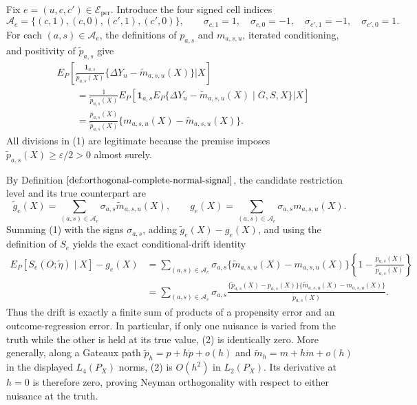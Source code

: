 Fix \(e=(u,c,c')\in\mathcal E_{\mathrm{per}}\).  Introduce the four signed cell indices
\[
\mathcal A_e=\{(c,1),(c,0),(c',1),(c',0)\},\qquad
\sigma_{c,1}=1,\quad \sigma_{c,0}=-1,\quad
\sigma_{c',1}=-1,\quad \sigma_{c',0}=1.
\]
For each \((a,s)\in\mathcal A_e\), the definitions of \(p_{a,s}\) and \(m_{a,s,u}\), iterated conditioning, and positivity of \(\widetilde p_{a,s}\) give
\[
\begin{aligned}
&E_P\!\left[
 \frac{\mathbf 1_{a,s}}{\widetilde p_{a,s}(X)}
 \{\Delta Y_u-\widetilde m_{a,s,u}(X)\}
 \mathrel{\Big|}X\right]\\
&\qquad=
\frac{1}{\widetilde p_{a,s}(X)}
 E_P\!\left[
 \mathbf 1_{a,s}
 E_P\{\Delta Y_u-\widetilde m_{a,s,u}(X)\mid G,S,X\}
 \mathrel{\Big|}X\right]\\
&\qquad=
\frac{p_{a,s}(X)}{\widetilde p_{a,s}(X)}
\{m_{a,s,u}(X)-\widetilde m_{a,s,u}(X)\}.
\end{aligned}
\tag{1}
\]
All divisions in (1) are legitimate because the premise imposes
\(\widetilde p_{a,s}(X)\geq\varepsilon/2>0\) almost surely.

By Definition \(\ref{def:orthogonal-complete-normal-signal}\), the candidate restriction level and its true counterpart are
\[
\widetilde g_e(X)=\sum_{(a,s)\in\mathcal A_e}
 \sigma_{a,s}\widetilde m_{a,s,u}(X),
\qquad
g_e(X)=\sum_{(a,s)\in\mathcal A_e}
 \sigma_{a,s}m_{a,s,u}(X).
\]
Summing (1) with the signs \(\sigma_{a,s}\), adding
\(\widetilde g_e(X)-g_e(X)\), and using the definition of \(S_e\) yields the exact conditional-drift identity
\[
\begin{aligned}
E_P[S_e(O;\widetilde\eta)\mid X]-g_e(X)
&=\sum_{(a,s)\in\mathcal A_e}\sigma_{a,s}
 \{\widetilde m_{a,s,u}(X)-m_{a,s,u}(X)\}
 \left\{1-\frac{p_{a,s}(X)}{\widetilde p_{a,s}(X)}\right\}\\
&=\sum_{(a,s)\in\mathcal A_e}\sigma_{a,s}
 \frac{\{\widetilde p_{a,s}(X)-p_{a,s}(X)\}
       \{\widetilde m_{a,s,u}(X)-m_{a,s,u}(X)\}}
      {\widetilde p_{a,s}(X)}.
\end{aligned}
\tag{2}
\]
Thus the drift is exactly a finite sum of products of a propensity error and an outcome-regression error.  In particular, if only one nuisance is varied from the truth while the other is held at its true value, (2) is identically zero.  More generally, along a Gateaux path
\(\widetilde p_h=p+h\dot p+o(h)\) and
\(\widetilde m_h=m+h\dot m+o(h)\) in the displayed \(L_4(P_X)\) norms, (2) is \(O(h^2)\) in \(L_2(P_X)\).  Its derivative at \(h=0\) is therefore zero, proving Neyman orthogonality with respect to either nuisance at the truth.

